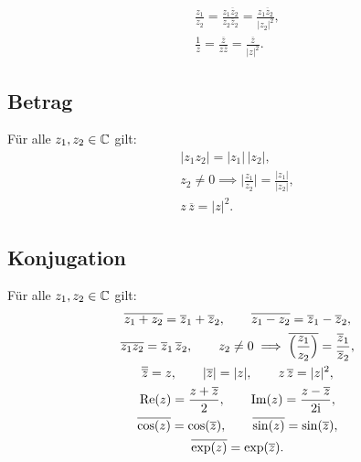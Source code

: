 \begin{gather}
\frac{z_1}{z_2}
= \frac{z_1\overline z_2}{z_2\overline z_2}
= \frac{z_1\overline z_2}{|z_2|^2},\\
\frac{1}{z} = \frac{\overline z}{z\overline z}
= \frac{\overline z}{|z|^2}.
\end{gather}

\subsection{Betrag}
Für alle $z_1,z_2\in\mathbb C$ gilt:
\begin{gather}
|z_1z_2| = |z_1|\,|z_2|,\\
z_2\ne 0\implies \Big|\frac{z_1}{z_2}\Big|
= \frac{|z_1|}{|z_2|},\\
z\,\overline z = |z|^2.
\end{gather}

\subsection{Konjugation}
Für alle $z_1,z_2\in\mathbb C$ gilt:
\begin{gather}
\overline{z_1+z_2} = \overline z_1+\overline z_2,\qquad
\overline{z_1-z_2} = \overline z_1-\overline z_2,\\
\overline{z_1 z_2} = \overline z_1\,\overline z_2,\qquad
z_2\ne 0 \implies \overline{\Big(\frac{z_1}{z_2}\Big)}
= \frac{\overline z_1}{\overline z_2},\\
\overline{\overline z}=z,\qquad
|\overline{z}| = |z|,\qquad
z\,\overline z = |z|^2,\\
\operatorname{Re}(z) = \frac{z+\overline z}{2},\qquad
\operatorname{Im}(z) = \frac{z-\overline z}{2\mathrm i},\\
\overline{\cos(z)} = \cos(\overline z),\qquad
\overline{\sin(z)} = \sin(\overline z),\\
\overline{\exp(z)} = \exp(\overline z).
\end{gather}

